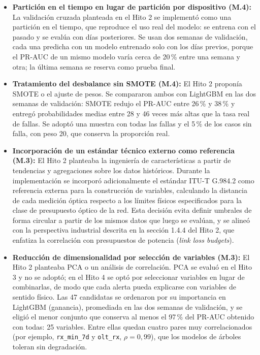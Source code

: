 \documentclass[12pt,a4paper]{article}
\begin{document}
\begin{itemize}
\item \textbf{Partición en el tiempo en lugar de partición por dispositivo (M.4):} La validación cruzada planteada en el Hito 2 se implementó como una partición en el tiempo, que reproduce el uso real del modelo: se entrena con el pasado y se evalúa con días posteriores. Se usan dos semanas de validación, cada una predicha con un modelo entrenado solo con los días previos, porque el PR-AUC de un mismo modelo varía cerca de 20\,\% entre una semana y otra; la última semana se reserva como prueba final.

\item \textbf{Tratamiento del desbalance sin SMOTE (M.4):} El Hito 2 proponía SMOTE o el ajuste de pesos. Se compararon ambos con LightGBM en las dos semanas de validación: SMOTE redujo el PR-AUC entre 26\,\% y 38\,\% y entregó probabilidades medias entre 28 y 46 veces más altas que la tasa real de fallas. Se adoptó una muestra con todas las fallas y el 5\,\% de los casos sin falla, con peso 20, que conserva la proporción real.

\item \textbf{Incorporación de un estándar técnico externo como referencia (M.3):} El Hito 2 planteaba la ingeniería de características a partir de tendencias y agregaciones sobre los datos históricos. Durante la implementación se incorporó adicionalmente el estándar ITU-T G.984.2 como referencia externa para la construcción de variables, calculando la distancia de cada medición óptica respecto a los límites físicos especificados para la clase de presupuesto óptico de la red. Esta decisión evita definir umbrales de forma circular a partir de los mismos datos que luego se evalúan, y se alineó con la perspectiva industrial descrita en la sección 1.4.4 del Hito 2, que enfatiza la correlación con presupuestos de potencia (\textit{link loss budgets}).

\item \textbf{Reducción de dimensionalidad por selección de variables (M.3):} El Hito 2 planteaba PCA o un análisis de correlación. PCA se evaluó en el Hito 3 y no se adoptó; en el Hito 4 se optó por seleccionar variables en lugar de combinarlas, de modo que cada alerta pueda explicarse con variables de sentido físico. Las 47 candidatas se ordenaron por su importancia en LightGBM (ganancia), promediada en las dos semanas de validación, y se eligió el menor conjunto que conserva al menos el 97\,\% del PR-AUC obtenido con todas: 25 variables. Entre ellas quedan cuatro pares muy correlacionados (por ejemplo, \texttt{rx\_min\_7d} y \texttt{olt\_rx}, $\rho = 0{,}99$), que los modelos de árboles toleran sin degradación.

\end{itemize}
\end{document}
